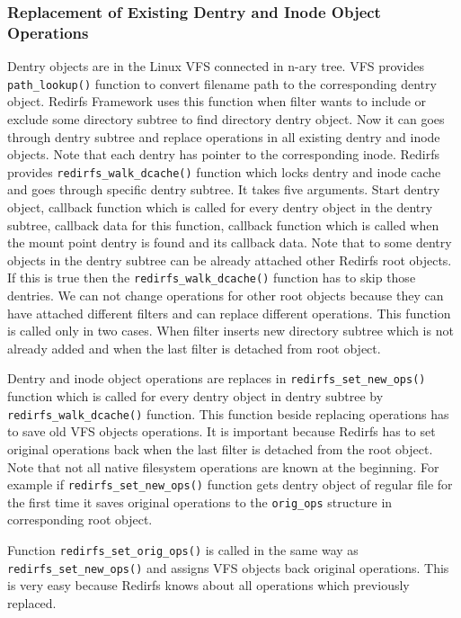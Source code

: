 \subsubsection{Replacement of Existing Dentry and Inode Object Operations}
Dentry objects are in the Linux VFS connected in n-ary tree. VFS provides
\texttt{path\_lookup()} function to convert filename path to the corresponding dentry
object. Redirfs Framework uses this function when filter wants to include or exclude
some directory subtree to find directory dentry object. Now it can goes through dentry
subtree and replace operations in all existing dentry and inode objects. Note that
each dentry has pointer to the corresponding inode. Redirfs provides
\texttt{redirfs\_walk\_dcache()} function which locks dentry and inode cache and goes
through specific dentry subtree. It takes five arguments. Start dentry object,
callback function which is called for every dentry object in the dentry subtree,
callback data for this function, callback function which is called when the mount
point dentry is found and its callback data. Note that to some dentry objects in the
dentry subtree can be already attached other Redirfs root objects. If this is true
then the \texttt{redirfs\_walk\_dcache()} function has to skip those dentries. We can
not change operations for other root objects because they can have attached different
filters and can replace different operations. This function is called only in two cases.
When filter inserts new directory subtree which is not already added and when the last
filter is detached from root object.

Dentry and inode object operations are replaces in \texttt{redirfs\_set\_new\_ops()}
function which is called for every dentry object in dentry subtree by
\texttt{redirfs\_walk\_dcache()} function. This function beside replacing operations
has to save old VFS objects operations. It is important because Redirfs has to set
original operations back when the last filter is detached from the root object. Note that
not all native filesystem operations are known at the beginning. For example if
\texttt{redirfs\_set\_new\_ops()} function gets dentry object of regular file for the
first time it saves original operations to the \texttt{orig\_ops} structure in
corresponding root object.

Function \texttt{redirfs\_set\_orig\_ops()} is called in the same way as
\texttt{redirfs\_set\_new\_ops()} and assigns VFS objects back original operations.
This is very easy because Redirfs knows about all operations which previously
replaced.
 
